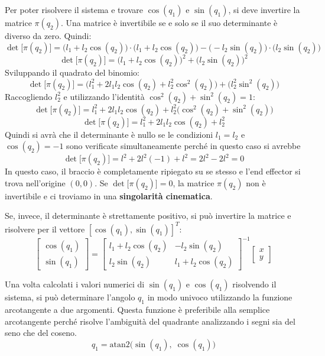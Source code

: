 \documentclass[11pt, a4paper]{report}
\begin{document}
Per poter risolvere il sistema e trovare $\cos(q_1)$ e $\sin(q_1)$, si deve invertire la matrice $\pi(q_2)$. Una matrice è invertibile se e solo se il suo determinante è diverso da zero. Quindi:
\[
    \det\bigl[ \pi(q_{2}) \bigr] =  \bigl( l_1 + l_2 \cos(q_2) \bigr) \cdot \bigl( l_1 + l_2 \cos(q_2) \bigr) - \bigl( -l_2 \sin(q_2) \bigr) \cdot \bigl( l_2 \sin(q_2) \bigr)
\]
\[
    \det\bigl[ \pi(q_{2}) \bigr] =  \bigl( l_1 + l_2 \cos(q_2) \bigr)^2 + \bigl( l_2 \sin(q_2) \bigr)^2
\]
Sviluppando il quadrato del binomio:
\[
    \det\bigl[ \pi(q_{2}) \bigr] =  \biggl( l_{1}^{2} + 2 l_{1} l_{2} \cos(q_{2}) + l_{2}^{2} \cos^{2}(q_{2}) \biggr) + \biggl( l_{2}^{2} \sin^{2}(q_{2}) \biggr)
\]
Raccogliendo $l_2^2$ e utilizzando l'identità $\cos^2(q_2) + \sin^2(q_2) = 1$:
\[
    \det\bigl[ \pi(q_{2}) \bigr] = l_{1}^{2} + 2 l_{1} l_{2} \cos(q_{2}) + l_{2}^{2} \bigl(\cos^{2}(q_{2}) + \sin^{2}(q_{2})\bigr)
\]
\[
    \det\bigl[ \pi(q_{2}) \bigr] = l_{1}^{2} + 2 l_{1} l_{2} \cos(q_{2}) + l_{2}^{2}
\]
Quindi si avrà che il determinante è nullo se le condizioni $l_1 = l_2$ e $\cos(q_2) = -1$ sono verificate simultaneamente perché in questo caso si avrebbe
\[
    \det\bigl[ \pi(q_{2}) \bigr] = l^{2} + 2 l^{2} (-1) + l^{2} = 2l^{2} - 2l^{2} = 0
\]
In questo caso, il braccio è completamente ripiegato su se stesso e l'end effector si trova nell'origine $(0,0)$.
Se $ \det\bigl[ \pi(q_{2}) \bigr] = 0 $, la matrice $\pi(q_2)$ non è invertibile e ci troviamo in una \textbf{singolarità cinematica}.

Se, invece, il determinante è strettamente positivo, si può invertire la matrice e risolvere per il vettore $[\cos(q_1), \sin(q_1)]^T$:
\[
    \begin{bmatrix}
        \cos(q_1)\\
        \sin(q_1)
    \end{bmatrix}
    =
    \begin{bmatrix}
        l_1 + l_2\cos(q_{2}) & - l_2\sin(q_{2})\\
        l_2\sin(q_{2}) & l_1 + l_2\cos(q_{2})
    \end{bmatrix}^{-1}
    \begin{bmatrix}
        x\\
        y
    \end{bmatrix}
\]

Una volta calcolati i valori numerici di $\sin(q_1)$ e $\cos(q_1)$ risolvendo il sistema, si può determinare l'angolo $q_1$ in modo univoco utilizzando la funzione arcotangente a due argomenti. Questa funzione è preferibile alla semplice arcotangente perché risolve l'ambiguità del quadrante analizzando i segni sia del seno che del coseno.
\[
    \boxed{q_{1} = \text{atan2} \biggl(\sin(q_{1}), \; \cos(q_{1}) \biggr)}
\]
\end{document}

